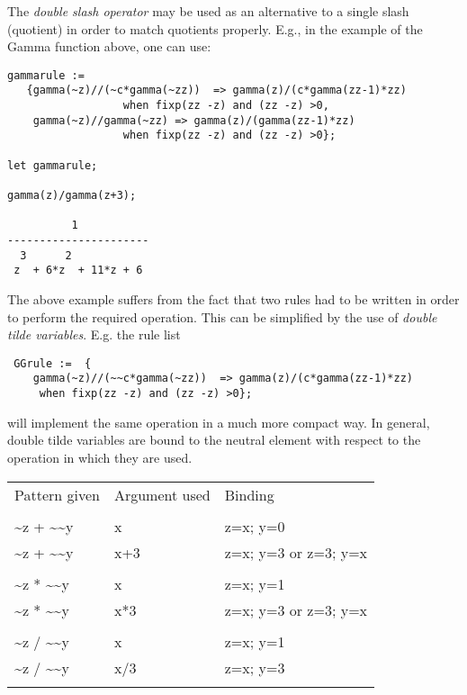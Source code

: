 The \emph{double slash operator} may be used as an alternative to a single
slash (quotient) in order to match quotients properly.  E.g., in the
example of the Gamma function above, one can use:
\begin{verbatim}
gammarule :=
   {gamma(~z)//(~c*gamma(~zz))  => gamma(z)/(c*gamma(zz-1)*zz)
                  when fixp(zz -z) and (zz -z) >0,
    gamma(~z)//gamma(~zz) => gamma(z)/(gamma(zz-1)*zz)
                  when fixp(zz -z) and (zz -z) >0};

let gammarule;

gamma(z)/gamma(z+3);

          1
----------------------
  3      2
 z  + 6*z  + 11*z + 6
\end{verbatim}
The above example suffers from the fact that two rules had to be
written in order to perform the required operation. This can be simplified
by the use of \emph{double tilde variables}. E.g. the rule list
\begin{verbatim}
 GGrule :=  {
    gamma(~z)//(~~c*gamma(~zz))  => gamma(z)/(c*gamma(zz-1)*zz)
     when fixp(zz -z) and (zz -z) >0};
\end{verbatim}
will implement the same operation in a much more compact way.
In general, double tilde variables are bound to the neutral element
with respect to the operation in which they are used.

\begin{tabular}{lll}

Pattern given & Argument used & Binding  \\
\\
\textasciitilde z + \textasciitilde \textasciitilde y  &   x   &  z=x; y=0  \\   
\textasciitilde z + \textasciitilde \textasciitilde y  &   x+3 &  z=x; y=3  or  z=3; y=x \\ 
\\
\textasciitilde z * \textasciitilde \textasciitilde y  &   x   &  z=x; y=1\\
\textasciitilde z * \textasciitilde \textasciitilde y  &   x*3 &  z=x; y=3  or  z=3; y=x\\
\\
\textasciitilde z / \textasciitilde \textasciitilde y  &    x   &  z=x; y=1\\
\textasciitilde z / \textasciitilde \textasciitilde y  &    x/3 &  z=x; y=3  \\
\\
\end{tabular}

